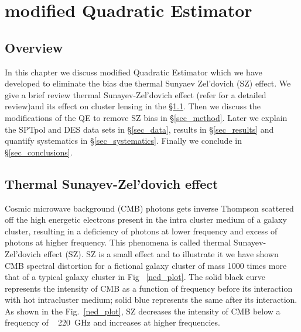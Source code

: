 \chapter{modified Quadratic Estimator}
\label{ch:analysis}
\section*{Overview}\label{ovr}
In this chapter we discuss modified Quadratic Estimator which we have developed to eliminate the bias due thermal Sunyaev Zel'dovich (SZ) effect. 
We give a brief review thermal Sunayev-Zel'dovich effect (refer  for a detailed review)and its effect on cluster lensing in the \S\ref{tsz}.
Then we discuss the modifications of the QE to remove SZ bias in \S\ref{sec_method}.
 Later we explain the SPTpol and DES data sets in \S\ref{sec_data}, results in \S\ref{sec_results} and quantify systematics in \S\ref{sec_systematics}.
Finally we conclude in \S\ref{sec_conclusions}.


\section{Thermal Sunayev-Zel'dovich effect}\label{tsz}

 Cosmic microwave background (CMB) photons gets inverse Thompson scattered off the high energetic electrons present in the intra cluster medium of a galaxy cluster, resulting in a deficiency of photons at lower frequency and excess of photons at higher frequency. 
 This phenomena is called thermal Sunayev-Zel'dovich effect (SZ). 
 SZ is a small effect and to illustrate it we have shown CMB spectral distortion for a fictional galaxy cluster of mass 1000 times more that of a typical galaxy cluster in Fig ~\ref{ned_plot}.
 The solid black curve represents the intensity of CMB as a function of frequency before its interaction with hot intracluster medium; solid blue represents the same after its interaction.
 As shown in the Fig.~\ref{ned_plot}, SZ decreases the intensity of CMB below a frequency of ~ 220 \,GHz and increases at higher frequencies. 
   
